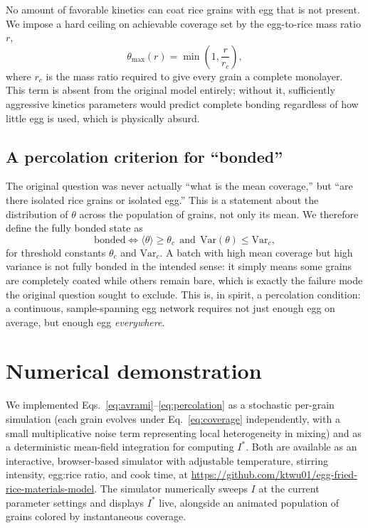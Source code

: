 \documentclass[11pt]{article}
\begin{document}
No amount of favorable kinetics can coat rice grains with egg that is not present. We impose a hard ceiling on achievable coverage set by the egg-to-rice mass ratio $r$,
\begin{equation}
    \theta_{\max}(r) = \min\!\left(1, \frac{r}{r_c}\right),
    \label{eq:stoich}
\end{equation}
where $r_c$ is the mass ratio required to give every grain a complete monolayer. This term is absent from the original model entirely; without it, sufficiently aggressive kinetics parameters would predict complete bonding regardless of how little egg is used, which is physically absurd.

\subsection{A percolation criterion for ``bonded''}

The original question was never actually ``what is the mean coverage,'' but ``are there isolated rice grains or isolated egg.'' This is a statement about the distribution of $\theta$ across the population of grains, not only its mean. We therefore define the fully bonded state as
\begin{equation}
    \text{bonded} \iff \langle \theta \rangle \ge \theta_c \ \ \text{and} \ \ \mathrm{Var}(\theta) \le \mathrm{Var}_c,
    \label{eq:percolation}
\end{equation}
for threshold constants $\theta_c$ and $\mathrm{Var}_c$. A batch with high mean coverage but high variance is not fully bonded in the intended sense: it simply means some grains are completely coated while others remain bare, which is exactly the failure mode the original question sought to exclude. This is, in spirit, a percolation condition: a continuous, sample-spanning egg network requires not just enough egg on average, but enough egg \emph{everywhere}.

\section{Numerical demonstration}

We implemented Eqs.~\eqref{eq:avrami}--\eqref{eq:percolation} as a stochastic per-grain simulation (each grain evolves under Eq.~\eqref{eq:coverage} independently, with a small multiplicative noise term representing local heterogeneity in mixing) and as a deterministic mean-field integration for computing $I^*$. Both are available as an interactive, browser-based simulator with adjustable temperature, stirring intensity, egg:rice ratio, and cook time, at \url{https://github.com/ktwu01/egg-fried-rice-materials-model}. The simulator numerically sweeps $I$ at the current parameter settings and displays $I^*$ live, alongside an animated population of grains colored by instantaneous coverage.
\end{document}
